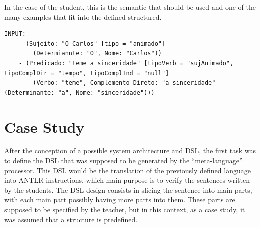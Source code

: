 
In the case of the student, this is the semantic that should be used and one of the many examples that fit into the defined structured.

\begin{center}
\begin{minipage}{13cm}
\begin{Verbatim}[frame=single, framesep=2mm, fontsize=\tiny]
INPUT:
    - (Sujeito: "O Carlos" [tipo = "animado"]
        (Determiannte: "O", Nome: "Carlos"))
    - (Predicado: "teme a sinceridade" [tipoVerb = "sujAnimado", tipoComplDir = "tempo", tipoComplInd = "null"]
        (Verbo: "teme", Complemento_Direto: "a sinceridade" (Determinante: "a", Nome: "sinceridade")))
\end{Verbatim}
\end{minipage}
\end{center}


\section{Case Study}
After the conception of a possible system architecture and DSL, the first task was to define the \textsc{DSL} that was supposed to be generated by the ``meta-language'' processor. This \textsc{DSL} would be the translation of the previously defined language into \textsc{ANTLR} instructions, which main purpose is to verify the sentences written by the students. The \textsc{DSL} design consists in slicing the sentence into main parts, with each main part possibly having more parts into them. These parts are supposed to be specified by the teacher, but in this context, as a case study, it was assumed that a structure is predefined.

